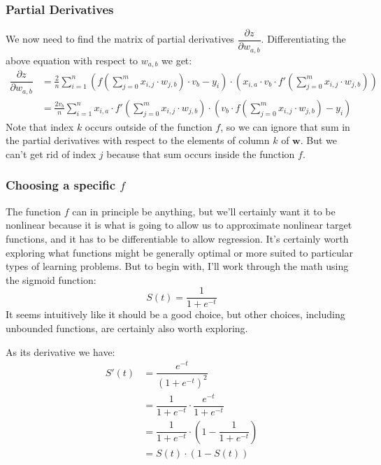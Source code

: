 \documentclass[11pt, oneside]{article}   	%
\begin{document}
\subsubsection{Partial Derivatives}

We now need to find the matrix of partial derivatives $\dfrac{\displaystyle\partial{z}}{\displaystyle\partial{w_{a,b}}}$. Differentiating the above equation with respect to $w_{a,b}$ we get:
\begin{align}
\dfrac{\displaystyle\partial{z}}{\displaystyle\partial{w_{a,b}}} &= \frac{2}{n} \sum\limits_{i = 1}^n (f(\sum_{j = 0}^m x_{i,j} \cdot w_{j,b}) \cdot v_b - y_i) \cdot (x_{i,a} \cdot v_b \cdot f'(\sum_{j=0}^m x_{i,j} \cdot w_{j,b})) \\
&= \frac{2 v_b}{n}  \sum\limits_{i = 1}^n x_{i,a} \cdot f'(\sum_{j=0}^m x_{i,j} \cdot w_{j,b}) \cdot (v_b \cdot f(\sum_{j = 0}^m x_{i,j} \cdot w_{j,b})  - y_i)
\end{align}
Note that index $k$ occurs outside of the function $f$, so we can ignore that sum in the partial derivatives with respect to the elements of column $k$ of $\textbf{w}$. But we can't get rid of index $j$ because that sum occurs inside the function $f$.

\subsubsection{Choosing a specific $f$}

The function $f$ can in principle be anything, but we'll certainly want it to be nonlinear because it is what is going to allow us to approximate nonlinear target functions, and it has to be differentiable to allow regression. It's certainly worth exploring what functions might be generally optimal or more suited to particular types of learning problems. But to begin with, I'll work through the math using the sigmoid function:
\begin{equation}
 S(t) = \dfrac{1}{1 + e^{-t}}
 \end{equation}
 It seems intuitively like it should be a good choice, but other choices, including unbounded functions, are certainly also worth exploring.
 
 As its derivative we have: 
  \begin{align}
 S'(t) &= \dfrac{e^{-t}}{(1 + e^{-t})^2} \\
 &= \dfrac{1}{1 + e^{-t}} \cdot \dfrac{e^{-t}}{1 + e^{-t}} \\
 &= \dfrac{1}{1 + e^{-t}} \cdot (1 - \dfrac{1}{1 + e^{-t}}) \\
 &= S(t) \cdot (1 - S(t))
 \end{align}
 
\end{document}

